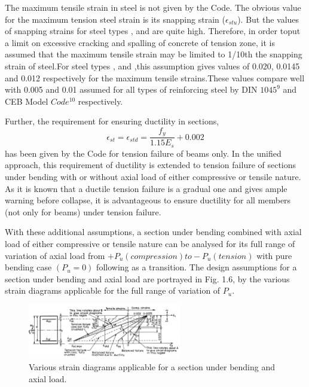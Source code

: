 The maximum tensile strain in steel is not given by the Code. The obvious
value for the maximum tension steel strain is its snapping strain
($\epsilon_{stu}$). But the values of snapping strains for steel types
{\fetwofivezero}, {\fefouronefive} and {\fefivezerozero} are quite high.
Therefore, in order toput a limit on excessive cracking and spalling of
concrete of tension zone, it is assumed that the maximum tensile strain
may be limited to 1/10th the snapping strain of steel.For steel types
{\fetwofivezero}, {\fefouronefive} and {\fefivezerozero},this assumption
gives values of 0.020, 0.0145 and 0.012 respectively for the maximum
tensile strains.These values compare well with 0.005 and 0.01 assumed for 
all types of reinforcing steel by DIN $1045^9$ and CEB Model $Code^{10}$
respectively.

Further, the requirement for ensuring ductility in sections,
$$\epsilon_{st}=\epsilon_{std}=\frac{f_y}{1.15 E_s}+0.002$$
has been given by the Code for tension failure of beams only. In the
uniﬁed approach, this requirement of ductility is extended to tension
failure of sections under bending with or without axial load of either
compressive or tensile nature. As it is known that a ductile tension
failure is a gradual one and gives ample warning before collapse, it
is advantageous to ensure ductility for all members (not only for beams) 
under tension failure.

With these additional assumptions, a section under bending combined with
axial load of either compressive or tensile nature can be analysed for
its full range of variation of axial load from
$+P_u (compression) to -P_u (tension)$ with pure bending case $(P_u=0)$
following as a transition. The design assumptions for a section under
bending and axial load are portrayed in Fig. 1.6, by the various strain
diagrams applicable for the full range of variation of $P_u$.

\begin{figure}
\centering
\includegraphics[width=0.6\textwidth]{images/various.png}
\caption{Various strain diagrams applicable for a section under bending and axial load.}
\label{fig:various}
\end{figure}


